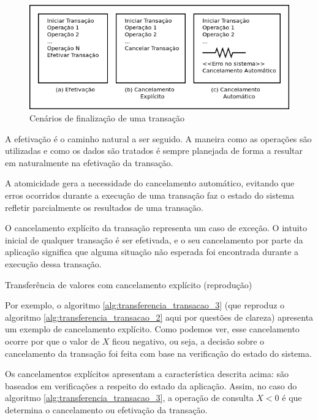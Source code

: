 \documentclass[11pt,twoside,a4paper]{book}
\begin{document}
\begin{figure}
  \centering
  \includegraphics[width=\textwidth]{cenarios_finalizacao} 
  \caption{Cenários de finalização de uma transação}
  \label{fig:cenarios_finalizacao} 
\end{figure}

A efetivação é o caminho natural a ser seguido. A maneira como as operações são utilizadas e como os dados são tratados é sempre planejada de forma a resultar em naturalmente na efetivação da transação.

A atomicidade gera a necessidade do cancelamento automático, evitando que erros ocorridos durante a execução de uma transação faz o estado do sistema refletir parcialmente os resultados de uma transação.

O cancelamento explícito da transação representa um caso de exceção. O intuito inicial de qualquer transação é ser efetivada, e o seu cancelamento por parte da aplicação significa que alguma situação não esperada foi encontrada durante a execução dessa transação.

\begin{algorithm}
\caption{Transferência de valores com cancelamento explícito (reprodução)}
\label{alg:transferencia_transacao_3}
\end{algorithm}

Por exemplo, o algoritmo \ref{alg:transferencia_transacao_3} (que reproduz o algoritmo \ref{alg:transferencia_transacao_2} aqui por questões de clareza) apresenta um exemplo de cancelamento explícito. Como podemos ver, esse cancelamento ocorre por que o valor de $X$ ficou negativo, ou seja, a decisão sobre o cancelamento da transação foi feita com base na verificação do estado do sistema.

Os cancelamentos explícitos apresentam a característica descrita acima: são baseados em verificações a respeito do estado da aplicação. Assim, no caso do algoritmo \ref{alg:transferencia_transacao_3}, a operação de consulta $X < 0$ é que determina o cancelamento ou efetivação da transação.
\end{document}
